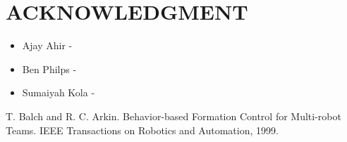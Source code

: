 \documentclass[letterpaper, 10 pt, conference]{ieeeconf}  %
\begin{document}
\section{ACKNOWLEDGMENT}

\begin{itemize}
\item Ajay Ahir - 
\item Ben Philps - 
\item Sumaiyah Kola - 
\end{itemize}


\begin{thebibliography}{99}

 T. Balch and R. C. Arkin. Behavior-based Formation Control for Multi-robot Teams. IEEE Transactions on Robotics and Automation, 1999.

\end{thebibliography}
\end{document}
